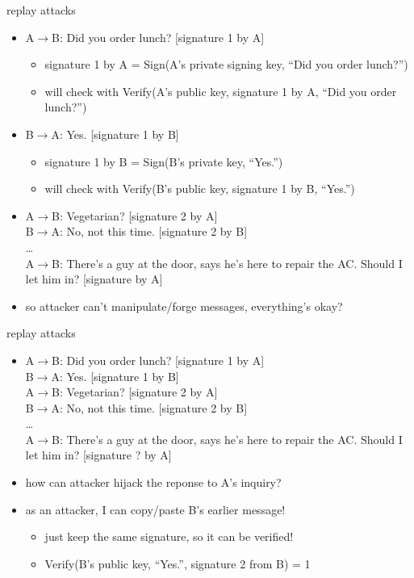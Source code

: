 \begin{frame}{replay attacks}
    \begin{itemize}
    \item A$\rightarrow$B: Did you order lunch? [signature 1 by A]
        \begin{itemize}
            \item signature 1 by A = Sign(A's private signing key, ``Did you order lunch?'')
            \item will check with Verify(A's public key, signature 1 by A, ``Did you order lunch?'')
        \end{itemize}
    \item B$\rightarrow$A: Yes. [signature 1 by B]  
        \begin{itemize}
            \item signature 1 by B = Sign(B's private key, ``Yes.'')
            \item will check with Verify(B's public key, signature 1 by B, ``Yes.'')
        \end{itemize}
    \item  A$\rightarrow$B: Vegetarian? [signature 2 by A]  \\
     B$\rightarrow$A: No, not this time. [signature 2 by B]  \\ \ldots \\
     A$\rightarrow$B: There's a guy at the door, says he's here to repair the AC. Should I let him in? [signature by A]
    \vspace{.5cm}
    \item so attacker can't manipulate/forge messages, everything's okay?
    \end{itemize}
\end{frame}

\begin{frame}{replay attacks}
    \begin{itemize}
    \item A$\rightarrow$B: Did you order lunch? [signature 1 by A] \\
          B$\rightarrow$A: Yes. [signature 1 by B]  \\
          A$\rightarrow$B: Vegetarian? [signature 2 by A] \\
          B$\rightarrow$A: No, not this time. [signature 2 by B] \\
          \ldots \\
          A$\rightarrow$B: There's a guy at the door, says he's here to repair the AC. Should I let him in? [signature ? by A]
    \item how can attacker hijack the reponse to A's inquiry?
    \vspace{.5cm}
    \item<2-> as an attacker, I can copy/paste B's earlier message!
        \begin{itemize}
        \item just keep the same signature, so it can be verified!
        \item Verify(B's public key, ``Yes.'', signature 2 from B) = 1
        \end{itemize}
    \end{itemize}
\end{frame}

